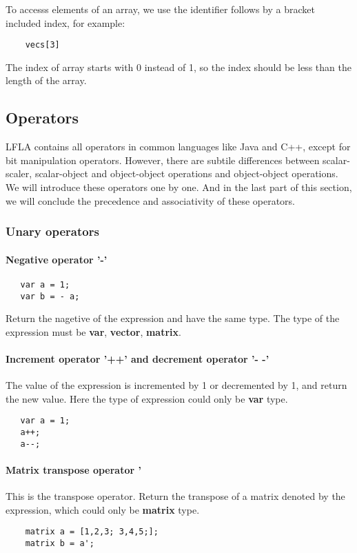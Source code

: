 \documentclass[12pt]{article} %
\begin{document}
To accesss elements of an array,  we use the identifier follows by a bracket included index, for example:
 \begin{lstlisting}
    vecs[3] 
\end{lstlisting}
The index of array starts with 0 instead of 1,  so the index should be less than the length of the array. 
\subsection{Operators} %
LFLA contains all operators in common languages like Java and C++, except for bit manipulation operators. However, there are subtile differences between scalar-scaler, scalar-object and object-object operations and object-object operations. We will introduce these operators one by one. And in the last part of this section, we will conclude the precedence and associativity of these operators.
\subsubsection{Unary operators}
\paragraph{Negative operator '-'}
 \begin{lstlisting}
   var a = 1;
   var b = - a;
\end{lstlisting}
Return the nagetive of the expression and have the same type. The type of the expression must be \textbf{var}, \textbf{vector}, \textbf{matrix}.
\paragraph{ Increment operator '++' and decrement operator '- -'}
The value of the expression is incremented by 1 or decremented by 1, and return the new value. Here the type of expression could only be \textbf{var} type.
 \begin{lstlisting}
   var a = 1;
   a++; 
   a--;
\end{lstlisting}
\paragraph{Matrix transpose operator  '}
This is the transpose operator. Return the transpose of a matrix denoted by the expression, which could only be \textbf{matrix} type.
 \begin{lstlisting}
    matrix a = [1,2,3; 3,4,5;];
    matrix b = a';
\end{lstlisting}
\end{document}
